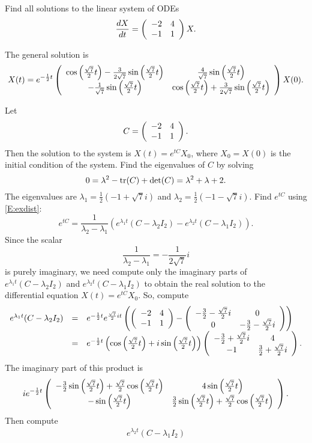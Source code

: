\documentclass{ximera}
\begin{document}
\begin{exercise} \label{c6.6.3}
Find all solutions to the linear system of ODEs
\[
\frac{dX}{dt} = \left(\begin{array}{rr} -2 & 4\\ -1 &1\end{array}\right) X.
\]

\begin{solution}

\ans The general solution is
\[
X(t) = e^{-\frac{1}{2}t}\left(\begin{array}{cc} \cos\left({\frac{\sqrt{7}}{2}t}\right) -
\frac{3}{2\sqrt{7}}\sin\left({\frac{\sqrt{7}}{2}t}\right) & \frac{4}{\sqrt{7}}\sin\left({\frac{\sqrt{7}}{2}t}\right)\\ -\frac{1}{\sqrt{7}}\sin\left({\frac{\sqrt{7}}{2}t}\right) &\cos\left({\frac{\sqrt{7}}{2}t}\right) +
\frac{3}{2\sqrt{7}}\sin\left({\frac{\sqrt{7}}{2}t}\right)\end{array}\right)X(0).
\]

\soln Let
\[
C = \left(\begin{array}{rr} -2 & 4\\ -1 &1\end{array}\right).
\]
Then the solution to the system is $X(t) = e^{tC}X_0$, where
$X_0 = X(0)$ is the initial condition of the system.
Find the eigenvalues of $C$ by solving
\[
0 = \lambda^2 - {\rm tr}(C) + \det(C) = \lambda^2 + \lambda + 2.
\]
The eigenvalues are $\lambda_1 = \frac{1}{2}(-1 + \sqrt{7}i)$ and
$\lambda_2 = \frac{1}{2}(-1 - \sqrt{7}i)$.  Find $e^{tC}$ using
\eqref{E:exdist}:
\[
e^{tC} = \frac{1}{\lambda_2 - \lambda_1}(e^{\lambda_1 t}(C -
\lambda_2 I_2) - e^{\lambda_2 t}(C - \lambda_1 I_2)).
\]
Since the scalar
\[
\frac{1}{\lambda_2 - \lambda_1} = -\frac{1}{2\sqrt{7}}i
\]
is purely
imaginary, we need compute only the imaginary parts of
$e^{\lambda_1 t}(C - \lambda_2 I_2)$ and $e^{\lambda_2 t}(C - \lambda_1 I_2)$
to obtain the real solution to the differential equation $X(t) = e^{tC}X_0$.
So, compute
\[
\begin{array}{rcl}
e^{\lambda_1 t}(C - \lambda_2 I_2)
& = & e^{-\frac{1}{2}t}e^{\frac{\sqrt{7}}{2}it}
\left(\left(\begin{array}{rr} -2 & 4\\ -1 &1\end{array}\right) - \left(\begin{array}{cc} -\frac{3}{2} - \frac{\sqrt{7}}{2}i & 0\\ 0 &-\frac{3}{2} - \frac{\sqrt{7}}{2}i\end{array}\right)\right) \\
& = & e^{-\frac{1}{2}t}\left(\cos\left(\frac{\sqrt{7}}{2}t\right) +
i\sin\left(\frac{\sqrt{7}}{2}t\right)\right)
\left(\begin{array}{cc} -\frac{3}{2} + \frac{\sqrt{7}}{2}i & 4\\ -1 &\frac{3}{2} +
\frac{\sqrt{7}}{2}i\end{array}\right).
\end{array}
\]
The imaginary part of this product is
\[
ie^{-\frac{1}{2}t}\left(\begin{array}{cc} -\frac{3}{2}\sin\left(\frac{\sqrt{7}}{2}
t\right) + \frac{\sqrt{7}}{2}\cos\left(\frac{\sqrt{7}}{2}t\right) & 4\sin\left(\frac{\sqrt{7}}{2}t\right)\\ -\sin\left(\frac{\sqrt{7}}{2}t\right) &\frac{3}{2}\sin\left(\frac{\sqrt{7}}{2}
t\right) + \frac{\sqrt{7}}{2}\cos\left(\frac{\sqrt{7}}{2}t\right)\end{array}\right).
\]
Then compute
\[
\begin{array}{rcl}
e^{\lambda_2 t}(C - \lambda_1 I_2)

\end{array}\]
\end{solution}
\end{exercise}
\end{document}
